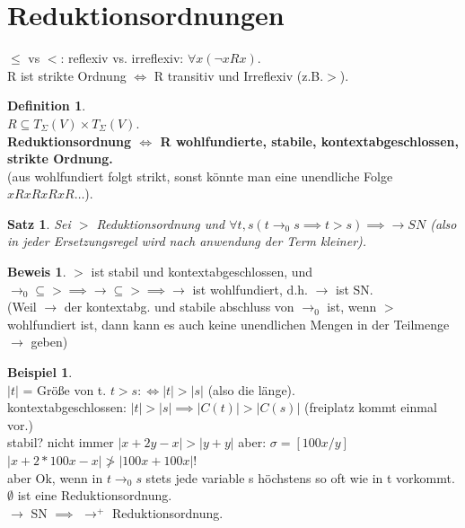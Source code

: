 \documentclass{article}
\newtheorem{satz}{Satz}
\theoremstyle{definition}
\newtheorem{beweis}{Beweis}[section]
\newtheorem{beispiel}{Beispiel}[section]
\newtheorem{definition}{Definition}[section]
\begin{document}
	\section{Reduktionsordnungen}
	$\leq$ vs $<$: reflexiv vs. irreflexiv: $\forall x(\lnot xRx)$.\\
	R ist strikte Ordnung $\iff$ R transitiv und Irreflexiv (z.B.$ >$).\\
	\begin{definition}\ \\
	$R\subseteq T_\Sigma(V)\times T_\Sigma(V)$.\\
	\textbf{Reduktionsordnung $\iff$ R wohlfundierte, stabile, kontextabgeschlossen, strikte Ordnung.}\\
	(aus wohlfundiert folgt strikt, sonst könnte man eine unendliche Folge $xRxRxRxR\dots$).
	\end{definition}
	\begin{satz}Sei $>$ Reduktionsordnung und $\forall t,s (t\to_0 s\implies t>s)\implies \to SN$ (also in jeder Ersetzungsregel wird nach anwendung der Term kleiner).
	\end{satz}
	\begin{beweis}
	$>$ ist stabil und kontextabgeschlossen, und $\to_0\subseteq > \implies \to\subseteq >\implies \to$ ist wohlfundiert, d.h. $\to$ ist SN.\\
	(Weil $\to$ der kontextabg. und stabile abschluss von $\to_0$ ist, wenn $>$ wohlfundiert ist, dann kann es auch keine unendlichen Mengen in der Teilmenge $\to$ geben)\\
	\end{beweis}
	\begin{beispiel}\ \\
	$|t|$ = Größe von t. $t>s:\iff |t|>|s|$ (also die länge).\\
	kontextabgeschlossen: $|t|>|s|\implies |C(t)|>|C(s)|$ (freiplatz kommt einmal vor.)\\
	stabil? nicht immer $|x+2y-x|> |y+y|$ aber: $\sigma=[100x/y]$ $|x+2*100x-x|\ngtr |100x+100x|$!\\
	aber Ok, wenn in $t\to_0 s$ stets jede variable s höchstens so oft wie in t vorkommt.\\
	$\emptyset$ ist eine Reduktionsordnung.\\
	$\to$ SN $\implies$ $\to^+$ Reduktionsordnung.\\
	\end{beispiel}
\end{document}
